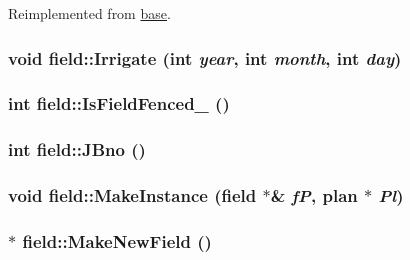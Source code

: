 Reimplemented from \hyperlink{classbase_ad2f5f5c9ec517641f63e52646cf49ad9}{base}.\hypertarget{classfield_abd51d3a66f0da4571963d53197e84914}{
\subsubsection[{Irrigate}]{\setlength{\rightskip}{0pt plus 5cm}void field::Irrigate (int {\em year}, \/  int {\em month}, \/  int {\em day})}}
\label{classfield_abd51d3a66f0da4571963d53197e84914}
\hypertarget{classfield_a71f3063168d6fd870a8f46ae64de6e43}{
\subsubsection[{IsFieldFenced\_\-}]{\setlength{\rightskip}{0pt plus 5cm}int field::IsFieldFenced\_\- ()}}
\label{classfield_a71f3063168d6fd870a8f46ae64de6e43}
\hypertarget{classfield_aa93627cc48e5c33da7ce60ef2b06fb91}{
\subsubsection[{JBno}]{\setlength{\rightskip}{0pt plus 5cm}int field::JBno ()}}
\label{classfield_aa93627cc48e5c33da7ce60ef2b06fb91}
\hypertarget{classfield_aa5c556bd1ec5b80a42441d0ac4a65f4c}{
\subsubsection[{MakeInstance}]{\setlength{\rightskip}{0pt plus 5cm}void field::MakeInstance ({\bf field} $\ast$\& {\em fP}, \/  {\bf plan} $\ast$ {\em Pl})}}
\label{classfield_aa5c556bd1ec5b80a42441d0ac4a65f4c}
\hypertarget{classfield_a4d3c3f8c50e61befbbda998cc4a7437d}{
\subsubsection[{MakeNewField}]{ $\ast$ field::MakeNewField ()}}
